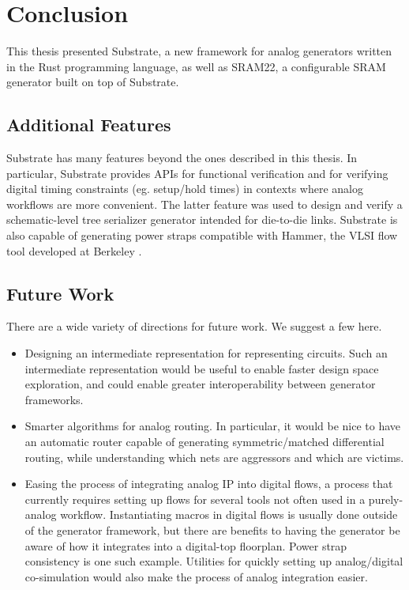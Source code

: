 \chapter{Conclusion} \label{sec:conclusion}

This thesis presented Substrate, a new framework for analog generators
written in the Rust programming language, as well as SRAM22, a configurable
SRAM generator built on top of Substrate.

\section{Additional Features}

Substrate has many features beyond the ones described in this thesis.
In particular, Substrate provides APIs for functional verification
and for verifying digital timing constraints (eg. setup/hold times)
in contexts where analog workflows are more convenient.
The latter feature was used to design and verify a schematic-level tree serializer
generator intended for die-to-die links. Substrate is also capable
of generating power straps compatible with Hammer, the VLSI
flow tool developed at Berkeley \cite{hammer}.

\section{Future Work}

There are a wide variety of directions for future work.
We suggest a few here.

\begin{itemize}
\item Designing an intermediate representation for representing circuits.
Such an intermediate representation would be useful to enable faster
design space exploration, and could enable greater interoperability between generator frameworks.
\item Smarter algorithms for analog routing. In particular, it would be nice to have 
an automatic router capable of generating symmetric/matched differential routing,
while understanding which nets are aggressors and which are victims.
\item Easing the process of integrating analog IP into digital flows, a process
that currently requires setting up flows for several tools not often used in a purely-analog workflow.
Instantiating macros in digital flows is usually done outside of the generator framework,
but there are benefits to having the generator be aware of how it integrates into a digital-top floorplan.
Power strap consistency is one such example.
Utilities for quickly setting up analog/digital co-simulation would also make the process of analog
integration easier.
\end{itemize}
